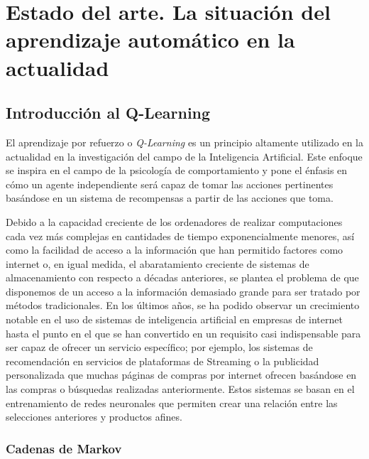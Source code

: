 \documentclass[11pt,spanish,listoffigures,listoftables]{tfgetsinf}
\begin{document}
\chapter{Estado del arte. La situación del aprendizaje automático en la actualidad}

\section{Introducción al Q-Learning}

El aprendizaje por refuerzo o \textit{Q-Learning} es un principio altamente utilizado en la actualidad en la investigación del campo de la Inteligencia Artificial. Este enfoque se inspira en el campo de la psicología de comportamiento y pone el énfasis en cómo un agente independiente será capaz de tomar las acciones pertinentes basándose en un sistema de recompensas a partir de las acciones que toma. \par 

Debido a la capacidad creciente de los ordenadores de realizar computaciones cada vez más complejas en cantidades de tiempo exponencialmente menores, así como la facilidad de acceso a la información que han permitido factores como internet o, en igual medida, el abaratamiento creciente de sistemas de almacenamiento con respecto a décadas anteriores, se plantea el problema de que disponemos de un acceso a la información demasiado grande para ser tratado por métodos tradicionales. En los últimos años, se ha podido observar un crecimiento notable en el uso de sistemas de inteligencia artificial en empresas de internet hasta el punto en el que se han convertido en un requisito casi indispensable para ser capaz de ofrecer un servicio específico; por ejemplo, los sistemas de recomendación en servicios de plataformas de Streaming o la publicidad personalizada que muchas páginas de compras por internet ofrecen basándose en las compras o búsquedas realizadas anteriormente. Estos sistemas se basan en el entrenamiento de redes neuronales que permiten crear una relación entre las selecciones anteriores y productos afines.

\subsection{Cadenas de Markov}
\end{document}
